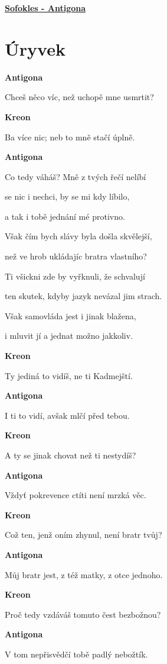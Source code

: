 \documentclass[11pt]{article}
\begin{document}
    \begin{center}
        \underline{\textbf{\Huge Sofokles - Antigona}}
    \end{center}
    \section*{Úryvek}
    \textbf{Antigona}

    Chceš něco víc, než uchopě mne usmrtit?

    \textbf{Kreon}

    Ba více nic; neb to mně stačí úplně.

    \textbf{Antigona}

    Co tedy váháš? Mně z tvých řečí nelíbí

    se nic i nechci, by se mi kdy líbilo,

    a tak i tobě jednání mé protivno.

    Však čím bych slávy byla došla skvělejší,

    než ve hrob ukládajíc bratra vlastního?

    Ti všickni zde by vyřknuli, že schvalují

    ten skutek, kdyby jazyk nevázal jim strach.

    Však samovláda jest i jinak blažena,

    i mluvit jí a jednat možno jakkoliv.

    \textbf{Kreon}

    Ty jediná to vidíš, ne ti Kadmejští.

    \textbf{Antigona}

    I ti to vidí, avšak mlčí před tebou.

    \textbf{Kreon}

    A ty se jinak chovat než ti nestydíš?

    \textbf{Antigona}

    Vždyť pokrevence ctíti není mrzká věc.

    \textbf{Kreon}

    Což ten, jenž oním zhynul, není bratr tvůj?

    \textbf{Antigona}

    Můj bratr jest, z též matky, z otce jednoho.

    \textbf{Kreon}

    Proč tedy vzdáváš tomuto čest bezbožnou?

    \textbf{Antigona}

    V tom nepřisvědčí tobě padlý nebožtík.
\end{document}
